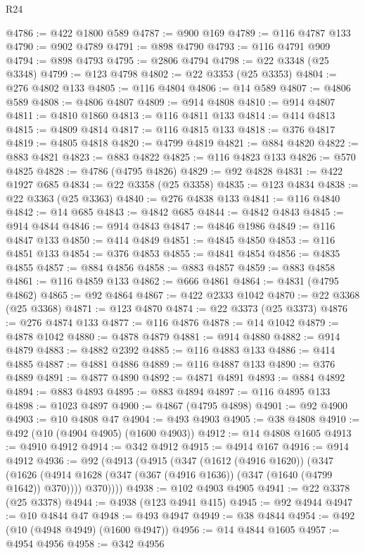 \begin{lexlean}{R24}
\begin{coremodule}
@4786 := @422 @1800 @589
@4787 := @900 @169
@4789 := @116 @4787 @133
@4790 := @902 @4789
@4791 := @898 @4790
@4793 := @116 @4791 @909
@4794 := @898 @4793
@4795 := @2806 @4794
@4798 := @22 @3348 (@25 @3348)
@4799 := @123 @4798
@4802 := @22 @3353 (@25 @3353)
@4804 := @276 @4802 @133
@4805 := @116 @4804
@4806 := @14 @589
@4807 := @4806 @589
@4808 := @4806 @4807
@4809 := @914 @4808
@4810 := @914 @4807
@4811 := @4810 @1860
@4813 := @116 @4811 @133
@4814 := @414 @4813
@4815 := @4809 @4814
@4817 := @116 @4815 @133
@4818 := @376 @4817
@4819 := @4805 @4818
@4820 := @4799 @4819
@4821 := @884 @4820
@4822 := @883 @4821
@4823 := @883 @4822
@4825 := @116 @4823 @133
@4826 := @570 @4825
@4828 := @4786 (@4795 @4826)
@4829 := @92 @4828
@4831 := @422 @1927 @685
@4834 := @22 @3358 (@25 @3358)
@4835 := @123 @4834
@4838 := @22 @3363 (@25 @3363)
@4840 := @276 @4838 @133
@4841 := @116 @4840
@4842 := @14 @685
@4843 := @4842 @685
@4844 := @4842 @4843
@4845 := @914 @4844
@4846 := @914 @4843
@4847 := @4846 @1986
@4849 := @116 @4847 @133
@4850 := @414 @4849
@4851 := @4845 @4850
@4853 := @116 @4851 @133
@4854 := @376 @4853
@4855 := @4841 @4854
@4856 := @4835 @4855
@4857 := @884 @4856
@4858 := @883 @4857
@4859 := @883 @4858
@4861 := @116 @4859 @133
@4862 := @666 @4861
@4864 := @4831 (@4795 @4862)
@4865 := @92 @4864
@4867 := @422 @2333 @1042
@4870 := @22 @3368 (@25 @3368)
@4871 := @123 @4870
@4874 := @22 @3373 (@25 @3373)
@4876 := @276 @4874 @133
@4877 := @116 @4876
@4878 := @14 @1042
@4879 := @4878 @1042
@4880 := @4878 @4879
@4881 := @914 @4880
@4882 := @914 @4879
@4883 := @4882 @2392
@4885 := @116 @4883 @133
@4886 := @414 @4885
@4887 := @4881 @4886
@4889 := @116 @4887 @133
@4890 := @376 @4889
@4891 := @4877 @4890
@4892 := @4871 @4891
@4893 := @884 @4892
@4894 := @883 @4893
@4895 := @883 @4894
@4897 := @116 @4895 @133
@4898 := @1023 @4897
@4900 := @4867 (@4795 @4898)
@4901 := @92 @4900
@4903 := @10 @4808 @47
@4904 := @493 @4903
@4905 := @38 @4808
@4910 := @492 (@10 (@4904 @4905) (@1600 @4903))
@4912 := @14 @4808 @1605
@4913 := @4910 @4912
@4914 := @342 @4912
@4915 := @4914 @167
@4916 := @914 @4912
@4936 := @92
    (@4913
      (@4915
        (@347
          (@1612 (@4916 @1620))
          (@347
            (@1626 (@4914 @1628 (@347 (@367 (@4916 @1636)) (@347 (@1640 (@4799 @1642)) @370))))
            @370))))
@4938 := @102 @4903 @4905
@4941 := @22 @3378 (@25 @3378)
@4944 := @4938 (@123 @4941 @415)
@4945 := @92 @4944
@4947 := @10 @4844 @47
@4948 := @493 @4947
@4949 := @38 @4844
@4954 := @492 (@10 (@4948 @4949) (@1600 @4947))
@4956 := @14 @4844 @1605
@4957 := @4954 @4956
@4958 := @342 @4956

\end{coremodule}
\end{lexlean}
